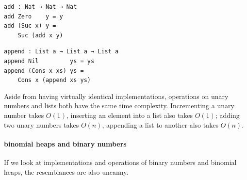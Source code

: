 \documentclass[\main/thesis.tex]{subfiles}
\begin{document}
\noindent\begin{minipage}{.45\textwidth}
\begin{lstlisting}[basicstyle=\ttfamily\scriptsize]
add : Nat → Nat → Nat
add Zero    y = y
add (Suc x) y =
    Suc (add x y)
\end{lstlisting}
\end{minipage}\hfill
\begin{minipage}{.48\textwidth}
\begin{lstlisting}[basicstyle=\ttfamily\scriptsize]
append : List a → List a → List a
append Nil         ys = ys
append (Cons x xs) ys =
    Cons x (append xs ys)
\end{lstlisting}
\end{minipage}

Aside from having virtually identical implementations, operations on unary numbers
and lists both have the same time complexity. Incrementing a unary number takes
$ O(1) $, inserting an element into a list also takes $ O(1) $; adding two unary
numbers takes $ O(n) $, appending a list to another also takes $ O(n) $.

\paragraph{binomial heaps and binary numbers}

If we look at implementations and operations of binary numbers and binomial
heaps, the resemblances are also uncanny.

\begin{center}
\end{center}
\end{document}
